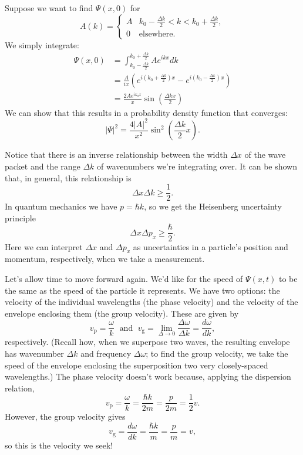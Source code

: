 \documentclass[../p052main.tex]{subfiles}
\begin{document}
\begin{example}
    Suppose we want to find $\Psi(x,0)$ for
    \[ A(k) = \begin{cases} A & k_0 - \frac{\Delta k}{2} < k < k_0 + \frac{\Delta k}{2}, \\ 0 & \text{elsewhere}. \end{cases} \]
    We simply integrate:
    \begin{align*}
        \Psi(x,0) &= \int_{k_0 - \frac{\Delta k}{2}}^{k_0 + \frac{\Delta k}{2}} Ae^{ikx}dk \\
        &= \frac{A}{ix} \left( e^{i(k_0 + \frac{\Delta k}{2})x} - e^{i(k_0 - \frac{\Delta k}{2})x} \right) \\
        &= \frac{2Ae^{ik_0x}}{x} \sin\left( \frac{\Delta k x}{2} \right)
    \end{align*}
    We can show that this results in a probability density function that converges:
    \[ |\Psi|^2 = \frac{4|A|^2}{x^2} \sin^2 \left( \frac{\Delta k}{2}x \right). \]
\end{example}

Notice that there is an inverse relationship between the width $\Delta x$ of the wave packet and the range $\Delta k$ of wavenumbers we're integrating over.
It can be shown that, in general, this relationship is
\[ \Delta x \Delta k \geq \frac{1}{2}. \]
In quantum mechanics we have $p = \hbar k$, so we get the Heisenberg uncertainty principle
\[ \Delta x \Delta p_x \geq \frac{\hbar}{2}. \]
Here we can interpret $\Delta x$ and $\Delta p_x$ as uncertainties in a particle's position and momentum, respectively, when we take a measurement.

Let's allow time to move forward again.
We'd like for the speed of $\Psi(x,t)$ to be the same as the speed of the particle it represents.
We have two options: the velocity of the individual wavelengths (the phase velocity) and the velocity of the envelope enclosing them (the group velocity).
These are given by
\[ v_\textrm{p} = \frac{\omega}{k} \;\text{ and }\; v_\textrm{g} = \lim_{\Delta \to 0} \frac{\Delta \omega}{\Delta k} = \frac{d\omega}{dk}, \]
respectively.
(Recall how, when we superpose two waves, the resulting envelope has wavenumber $\Delta k$ and frequency $\Delta \omega$; to find the group velocity, we take the speed of the envelope enclosing the superposition two very closely-spaced wavelengths.)
The phase velocity doesn't work because, applying the dispersion relation,
\[ v_\textrm{p} = \frac{\omega}{k} = \frac{\hbar k}{2m} = \frac{p}{2m} = \frac{1}{2}v. \]
However, the group velocity gives
\[ v_\textrm{g} = \frac{d\omega}{dk} = \frac{\hbar k}{m} = \frac{p}{m} = v, \]
so this is the velocity we seek!
\end{document}
